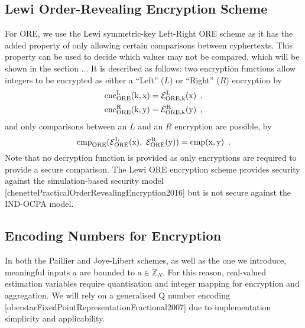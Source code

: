 \subsection{Lewi Order-Revealing Encryption Scheme}
For ORE, we use the Lewi symmetric-key Left-Right ORE scheme as it has the added property of only allowing certain comparisons between cyphertexts. This property can be used to decide which values may not be compared, which will be shown in the section ... It is described as follows: two encryption functions allow integers to be encrypted as either a ``Left'' ($L$) or ``Right'' ($R$) encryption by
\begin{equation}
   \begin{aligned} \label{eqn:lewi_l_r}
      &\operatorfont{enc}^L_{ORE}(k, x) = \mathcal{E}^L_{ORE,k}(x)\enspace, \\
      &\operatorfont{enc}^R_{ORE}(k, y) = \mathcal{E}^R_{ORE,k}(y)\enspace,
   \end{aligned}
\end{equation}
and only comparisons between an $L$ and an $R$ encryption are possible, by
\begin{equation}
   \operatorfont{cmp}_{ORE}(\mathcal{E}^L_{ORE}(x),\ \mathcal{E}^R_{ORE}(y)) = \operatorfont{cmp}(x, y)\enspace. \label{eqn:lewi_cmp}
\end{equation}
Note that no decryption function is provided as only encryptions are required to provide a secure comparison. The Lewi ORE encryption scheme provides security against the simulation-based security model [chenettePracticalOrderRevealingEncryption2016] but is not secure against the IND-OCPA model.

% 
% 

\subsection{Encoding Numbers for Encryption}
In both the Paillier and Joye-Libert schemes, as well as the one we introduce, meaningful inputs $a$ are bounded to $a \in \mathbb{Z}_N$. For this reason, real-valued estimation variables require quantisation and integer mapping for encryption and aggregation. We will rely on a generalised Q number encoding [oberstarFixedPointRepresentationFractional2007] due to implementation simplicity and applicability.

